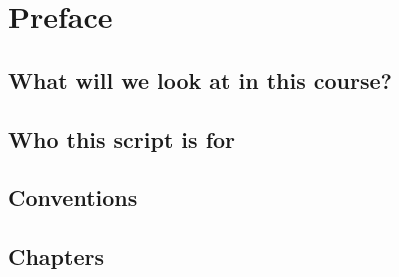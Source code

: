 \thispagestyle{empty}

\chapter*{Preface}


\section*{What will we look at in this course?}





\section*{Who this script is for}




\section*{Conventions}




\section*{Chapters}
